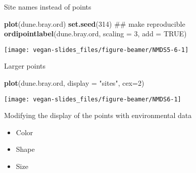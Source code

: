 \documentclass[10pt,ignorenonframetext,compress, aspectratio=169]{beamer}
\newenvironment{Shaded}{\begin{snugshade}}{\end{snugshade}}
\newcommand{\KeywordTok}[1]{\textcolor[rgb]{0.13,0.29,0.53}{\textbf{{#1}}}}
\newcommand{\DataTypeTok}[1]{\textcolor[rgb]{0.13,0.29,0.53}{{#1}}}
\newcommand{\DecValTok}[1]{\textcolor[rgb]{0.00,0.00,0.81}{{#1}}}
\newcommand{\StringTok}[1]{\textcolor[rgb]{0.31,0.60,0.02}{{#1}}}
\newcommand{\OtherTok}[1]{\textcolor[rgb]{0.56,0.35,0.01}{{#1}}}
\newcommand{\NormalTok}[1]{{#1}}
\begin{document}
\begin{frame}[fragile]{Site names instead of points}

\scriptsize

\begin{Shaded}
\begin{Highlighting}[]
\KeywordTok{plot}\NormalTok{(dune.bray.ord)}
\KeywordTok{set.seed}\NormalTok{(}\DecValTok{314}\NormalTok{) ## make reproducible}
\KeywordTok{ordipointlabel}\NormalTok{(dune.bray.ord, }\DataTypeTok{scaling =} \DecValTok{3}\NormalTok{, }\DataTypeTok{add =} \OtherTok{TRUE}\NormalTok{)}
\end{Highlighting}
\end{Shaded}

\begin{center}\texttt{[image: vegan-slides\_files/figure-beamer/NMDS5-6-1]} \end{center}

\normalsize

\end{frame}

\begin{frame}[fragile]{Larger points}

\begin{Shaded}
\begin{Highlighting}[]
\KeywordTok{plot}\NormalTok{(dune.bray.ord, }\DataTypeTok{display =} \StringTok{"sites"}\NormalTok{, }\DataTypeTok{cex=}\DecValTok{2}\NormalTok{)}
\end{Highlighting}
\end{Shaded}

\begin{center}\texttt{[image: vegan-slides\_files/figure-beamer/NMDS6-1]} \end{center}

\end{frame}

\begin{frame}{Modifying the display of the points with environmental
data}

\begin{itemize}
\itemsep1pt\parskip0pt
\item
  Color
\item
  Shape
\item
  Size
\end{itemize}

\end{frame}
\end{document}
